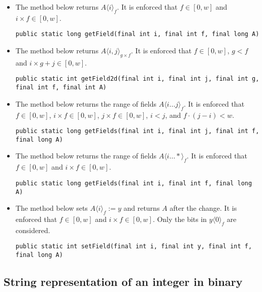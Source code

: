 \begin{itemize}
    \item
    The method below returns $A\langle i\rangle_f$. It is enforced that $f \in [0, w]$ and $i \times f \in [0, w]$.
    \begin{lstlisting}
public static long getField(final int i, final int f, final long A)
    \end{lstlisting}
    
    \item
    The method below returns $A\langle i, j \rangle_{g \times f}$. It is enforced that $f \in [0, w]$, $g < f$ and $i \times g + j \in [0, w]$.
    \begin{lstlisting}
public static int getField2d(final int i, final int j, final int g, final int f, final int A)
    \end{lstlisting}
    
    \item
    The method below returns the range of fields $A\langle i \dots j \rangle_f$. It is enforced that $f \in [0, w]$, $i \times f \in [0, w]$, $j \times f \in [0, w]$, $i < j$, and $f \cdot (j - i) < w$.
    \begin{lstlisting}
public static long getFields(final int i, final int j, final int f, final long A)
    \end{lstlisting}
    
    \item
    The method below returns the range of fields $A\langle i \dots * \rangle_f$. It is enforced that $f \in [0, w]$ and $i \times f \in [0, w]$.
    \begin{lstlisting}
public static long getFields(final int i, final int f, final long A)
    \end{lstlisting}
    
    \item
    The method below sets $A\langle i \rangle_f := y$ and returns $A$ after the change. It is enforced that $f \in [0, w]$ and $i \times f \in [0, w]$. Only the bits in $y\langle 0 \rangle_f$ are considered.
    \begin{lstlisting}
public static int setField(final int i, final int y, final int f, final long A)
    \end{lstlisting}
\end{itemize}

\subsection{String representation of an integer in binary}

